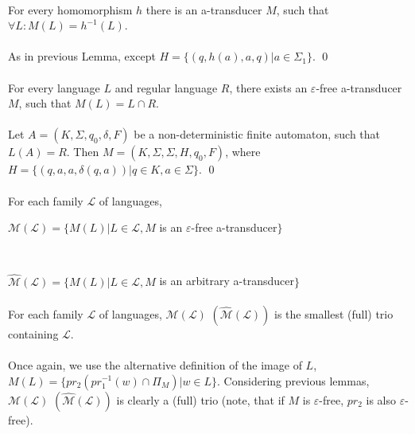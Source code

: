 \paragraph{}
\clema For every homomorphism $h$ there is an a-transducer $M$, such that $\forall L: M(L) = h^{-1}(L)$.

\paragraph{}
\dokaz As in previous Lemma, except $H = \{ (q, h(a), a, q) | a \in \Sigma_{1} \}$. \qed

\paragraph{}
\clema For every language $L$ and regular language $R$, there exists an $\varepsilon $-free a-transducer $M$, such that $M(L) = L \cap R$.

\paragraph{}
\dokaz Let $A = (K, \Sigma, q_{0}, \delta, F)$ be a non-deterministic finite automaton, such that $L(A) = R$. Then $M=(K, \Sigma, \Sigma, H, q_{0}, F)$, where $H=\{ (q, a, a, \delta (q,a)) | q \in K, a \in \Sigma \} $. \qed

\paragraph{}
\oznacenie For each family $\mathcal{L} $ of languages, \\
\centerline{$\mathcal{M(L)} = \{ M(L) | L \in \mathcal{L}, M$ is an $\varepsilon $-free a-transducer$\} $} \\
\centerline{$\mathcal{\hat{M}(L)} = \{ M(L) | L \in \mathcal{L}, M$ is an arbitrary a-transducer$\} $}

\paragraph{}
\cveta For each family $\mathcal{L} $ of languages, $\mathcal{M(L)} $ $(\mathcal{\hat{M}(L)}) $ is the smallest (full) trio containing $\mathcal{L} $.

\paragraph{}
\dokaz Once again, we use the alternative definition of the image of $L$, $M(L) = \{pr_{2} \allowbreak (pr_{1}^{-1}(w) \cap \Pi_{M}) | w \in L \}$. Considering previous lemmas, $\mathcal{M(L)} $ $(\mathcal{\hat{M}(L)}) $ is clearly a (full) trio (note, that if $M$ is $\varepsilon $-free, $pr_{2}$ is also $\varepsilon $-free).

